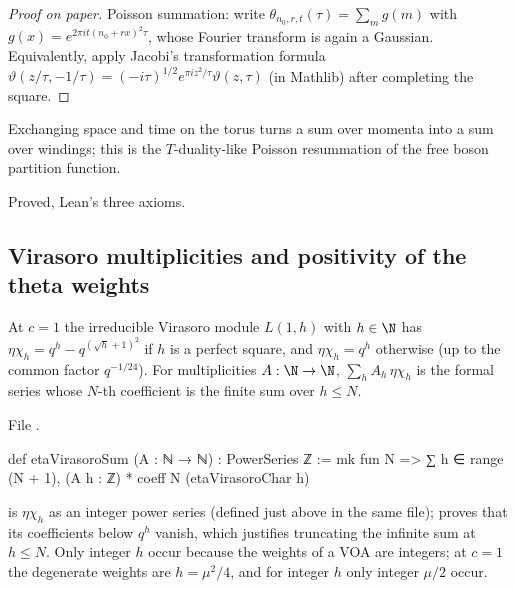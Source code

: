 \begin{proof}[Proof on paper]
Poisson summation: write $\theta_{n_0,r,t}(\tau)=\sum_m g(m)$ with $g(x)=e^{2\pi it(n_0+rx)^2\tau}$, whose Fourier
transform is again a Gaussian. Equivalently, apply Jacobi's transformation formula
$\vartheta(z/\tau,-1/\tau)=(-i\tau)^{1/2}e^{\pi iz^2/\tau}\vartheta(z,\tau)$ (in Mathlib) after completing the square.
\end{proof}

\begin{physics}
Exchanging space and time on the torus turns a sum over momenta into a sum over windings; this is the
$T$-duality-like Poisson resummation of the free boson partition function.
\end{physics}

\begin{status}
Proved, Lean's three axioms.
\end{status}

\subsection{Virasoro multiplicities and positivity of the theta weights}

\begin{definition}[The $c=1$ Virasoro characters; GR (3.4)--(3.7)]\label{l22:def:etavir}
At $c=1$ the irreducible Virasoro module $L(1,h)$ with $h\in\N$ has $\eta\chi_h=q^{h}-q^{(\sqrt h+1)^2}$ if $h$ is a
perfect square, and $\eta\chi_h=q^h$ otherwise (up to the common factor $q^{-1/24}$). For multiplicities
$A:\N\to\N$, $\sum_hA_h\,\eta\chi_h$ is the formal series whose $N$-th coefficient is the finite sum over $h\le N$.
\end{definition}
\noindent File .
\begin{leancode}
def etaVirasoroSum (A : ℕ → ℕ) : PowerSeries ℤ :=
  mk fun N => ∑ h ∈ range (N + 1), (A h : ℤ) * coeff N (etaVirasoroChar h)
\end{leancode}

\begin{dictionary}
 is $\eta\chi_h$ as an integer power series (defined just above in the same file);
 proves that its coefficients below $q^h$ vanish, which justifies truncating
the infinite sum at $h\le N$. Only integer $h$ occur because the weights of a VOA are integers; at $c=1$ the
degenerate weights are $h=\mu^2/4$, and for integer $h$ only integer $\mu/2$ occur.
\end{dictionary}

